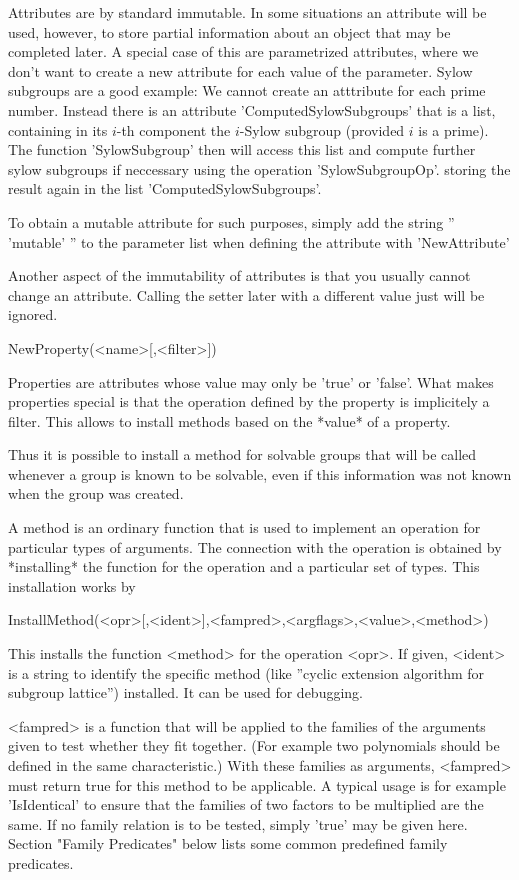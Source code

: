 \danger
Attributes are by standard immutable. In some situations an attribute will
be used, however, to store partial information about an object that may be
completed later. A special case of this are parametrized attributes, where
we don't want to create a new attribute for each value of the parameter.
Sylow subgroups are a good example: We cannot create an atttribute for each
prime number. Instead there is an attribute 'ComputedSylowSubgroups' that is
a list, containing in its $i$-th component the $i$-Sylow subgroup (provided
$i$ is a prime). The function 'SylowSubgroup' then will access this list and
compute further sylow subgroups if neccessary using the operation
'SylowSubgroupOp'. storing the result again in the list
'ComputedSylowSubgroups'.

\danger
To obtain a mutable attribute for such purposes, simply add the string 
'' 'mutable' '' to the parameter list when defining the attribute with
'NewAttribute'

\danger
Another aspect of the immutability of attributes is that you usually cannot
change an attribute. Calling the setter later with a different value just
will be ignored.

\>NewProperty(<name>[,<filter>])

Properties are attributes whose value may only be 'true' or 'false'.
What makes properties special is that the operation defined by the property
is implicitely a filter. This allows to install methods based on the *value*
of a property.

Thus it is possible to install a method for solvable groups that will be
called whenever a group is known to be solvable, even if this information
was not known when the group was created.


A method is an ordinary function that is used to implement an operation for
particular types of arguments. The connection with the operation is obtained
by *installing* the function for the operation and a particular set of
types. This installation works by 

\>InstallMethod(<opr>[,<ident>],<fampred>,<argflags>,<value>,<method>)

This installs the function <method> for the operation <opr>. If given,
<ident> is a string to identify the specific method (like ''cyclic extension
algorithm for subgroup lattice'') installed. It can be used for debugging.

<fampred> is a function that will be applied to the families of the
arguments given to test whether they fit together. (For example two
polynomials should be defined in the same characteristic.)
With these families as arguments, <fampred> must return
true for this method to be applicable. A typical usage is for example
'IsIdentical' to ensure that the families of two factors to be multiplied
are the same. If no family relation is to be tested, simply 'true' may be
given here. Section "Family Predicates" below lists some common predefined
family predicates.

